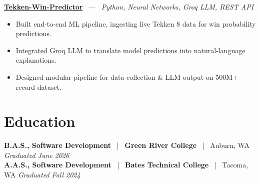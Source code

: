\documentclass[10pt, letterpaper]{article}
\newcommand{\jobhead}[4]{%
  \vspace{5pt}%
  {\bfseries\color{dark}#1}%
  ~{\color{light}|}~%
  {\bfseries\color{navy}#2}%
  ~{\color{light}|}~%
  {\color{light}#3}%
  \hfill{\color{light}\small\textit{#4}}\\[-2pt]%
}
\newcommand{\projhead}[3]{%
  \vspace{5pt}%
  {\bfseries\color{dark}\href{#2}{#1}}%
  ~{\color{light}---}~%
  {\color{light}\small\textit{#3}}\\[-2pt]%
}
\begin{document}
\projhead{Tekken-Win-Predictor}{}{Python, Neural Networks, Groq LLM, REST API}
\begin{itemize}
  \item Built end-to-end ML pipeline, ingesting live Tekken 8 data for win probability predictions.
  \item Integrated Groq LLM to translate model predictions into natural-language explanations.
  \item Designed modular pipeline for data collection \& LLM output on 500M+ record dataset.
\end{itemize}

\section{Education}

\jobhead{B.A.S., Software Development}{Green River College}{Auburn, WA}{Graduated June 2026}
\jobhead{A.A.S., Software Development}{Bates Technical College}{Tacoma, WA}{Graduated Fall 2024}
\end{document}
